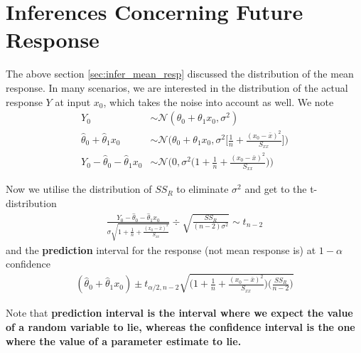 \documentclass[../probability-notes.tex]{subfiles}
\begin{document}
    \section{Inferences Concerning Future Response}
    The above section \ref{sec:infer_mean_resp} discussed the distribution of the mean response. In many scenarios, we are interested in the distribution of the actual response $Y$ at input $x_{0}$, which takes the noise into account as well. We note
    \begin{align*}
        Y_{0} &\sim \mathcal{N}(\theta_{0} + \theta_{1}x_{0}, \sigma^{2})\\
        \hat{\theta}_{0} + \hat{\theta}_{1}x_{0} &\sim \mathcal{N}\bigg(\theta_{0} + \theta_{1}x_{0}, \sigma^{2} \bigg[ \frac{1}{n} + \frac{(x_{0} - \bar{x})^{2}}{S_{xx}} \bigg]\bigg)\\
        Y_{0} - \hat{\theta}_{0} - \hat{\theta}_{1}x_{0} &\sim \mathcal{N}\bigg(0, \sigma^{2}\bigg( 1 + \frac{1}{n} + \frac{(x_{0} - \bar{x})^{2}}{S_{xx}} \bigg)\bigg)
    \end{align*}

    Now we utilise the distribution of $SS_{R}$ to eliminate $\sigma^{2}$ and get to the t-distribution
    \begin{align*}
        \frac{Y_{0} - \hat{\theta}_{0} - \hat{\theta}_{1}x_{0}}{\sigma\sqrt{1 + \frac{1}{n} + \frac{(x_{0} - \bar{x})^{2}}{S_{xx}}}} \div \sqrt{\frac{SS_{R}}{(n-2)\sigma^{2}}} \sim t_{n-2}
    \end{align*}
    and the \textbf{prediction} interval for the response (not mean response is) at $1-\alpha$ confidence
    \begin{align*}
        (\hat{\theta}_{0} + \hat{\theta}_{1}x_{0}) \pm t_{\alpha/2, n-2} \sqrt{\bigg( 1+ \frac{1}{n} + \frac{(x_{0} - \bar{x})^{2}}{S_{xx}} \bigg) \bigg( \frac{SS_{R}}{n-2}\bigg)}
    \end{align*}

    Note that \textbf{prediction interval is the interval where we expect the value of a random variable to lie, whereas the confidence interval is the one where the value of a parameter estimate to lie.}

    
\end{document}
